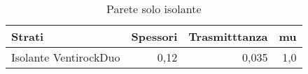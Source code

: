 \begin{table}
\centering
\caption{Parete solo isolante}
\begin{tabular}{lrrr}
\toprule
                 Strati & Spessori & Trasmitttanza &   mu \\
\midrule
 Isolante VentirockDuo  &     0,12 &         0,035 &  1,0 \\
\bottomrule
\end{tabular}
\end{table}
